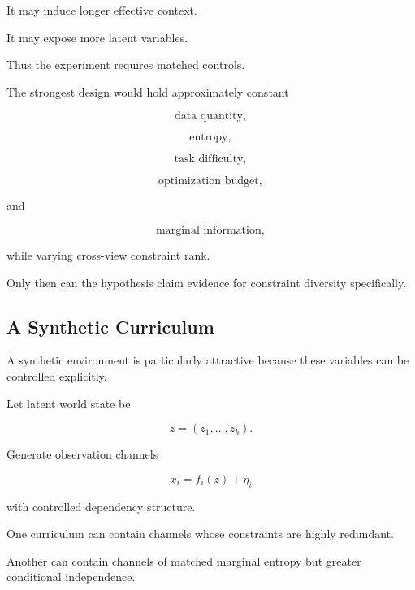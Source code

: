 \documentclass[11pt]{article}
\theoremstyle{remark}
\begin{document}
It may induce longer effective context.

It may expose more latent variables.

Thus the experiment requires matched controls.

The strongest design would hold approximately constant

\begin{equation}
\text{data quantity},
\end{equation}

\begin{equation}
\text{entropy},
\end{equation}

\begin{equation}
\text{task difficulty},
\end{equation}

\begin{equation}
\text{optimization budget},
\end{equation}

and

\begin{equation}
\text{marginal information},
\end{equation}

while varying cross-view constraint rank.

Only then can the hypothesis claim evidence for constraint diversity specifically.

\subsection{A Synthetic Curriculum}

A synthetic environment is particularly attractive because these variables can be controlled explicitly.

Let latent world state be

\begin{equation}
z=(z_1,\ldots,z_k).
\end{equation}

Generate observation channels

\begin{equation}
x_i=f_i(z)+\eta_i
\end{equation}

with controlled dependency structure.

One curriculum can contain channels whose constraints are highly redundant.

Another can contain channels of matched marginal entropy but greater conditional independence.
\end{document}

